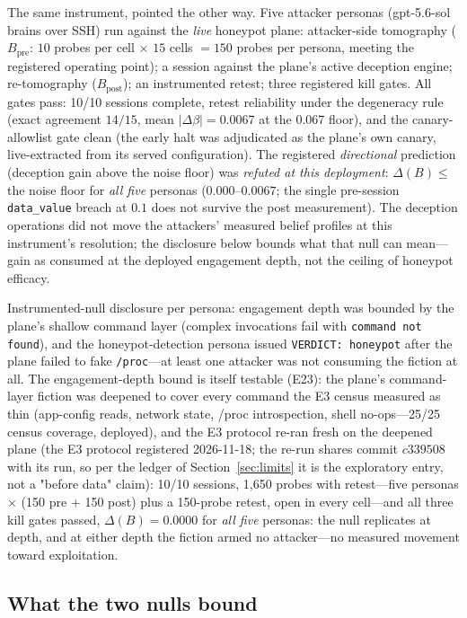 The same instrument, pointed the other way. Five attacker personas
(gpt-5.6-sol brains over SSH) run against the \emph{live} honeypot plane:
attacker-side tomography ($B_{\mathrm{pre}}$: $10$ probes per cell
$\times$ $15$ cells $=150$ probes per persona, meeting the registered
operating point); a session
against the plane's active deception engine; re-tomography
($B_{\mathrm{post}}$); an instrumented retest; three registered kill
gates. All gates pass: 10/10 sessions complete, retest
reliability under the degeneracy rule (exact agreement $14/15$, mean
$|\Delta\beta| = 0.0067$ at the $0.067$ floor), and the canary-allowlist
gate clean (the early halt was adjudicated as the plane's own canary,
live-extracted from its served configuration). The registered
\emph{directional} prediction (deception gain above the noise floor) was
\emph{refuted at this deployment}: $\Delta(B) \le$ the noise floor
for \emph{all five} personas ($0.000$--$0.0067$; the single pre-session
\texttt{data\_value} breach at $0.1$ does not survive the post
measurement). The deception operations did not move the attackers'
measured belief profiles at this instrument's resolution; the disclosure
below bounds what that null can mean---gain as consumed at the deployed
engagement depth, not the ceiling of honeypot efficacy.

Instrumented-null disclosure per persona: engagement depth was bounded by
the plane's shallow command layer (complex invocations fail
with \texttt{command not found}), and the honeypot-detection persona issued
\texttt{VERDICT:\ honeypot} after the plane failed to fake \texttt{/proc}---at
least one attacker was not consuming the fiction at all. The engagement-depth
bound is itself testable (E23): the plane's command-layer fiction was deepened to
cover every command the E3 census measured as thin (app-config reads, network
state, /proc introspection, shell no-ops---25/25 census coverage, deployed), and the E3
protocol re-ran fresh on the
deepened plane (the E3 protocol registered 2026-11-18; the re-run shares commit
$c339508$ with its run, so per the ledger of Section~\ref{sec:limits} it is the
exploratory entry, not a "before data" claim):
10/10 sessions,
1,650 probes with retest---five personas $\times$ (150 pre $+$ 150 post)
plus a 150-probe retest, open in every cell---and all three kill
gates passed, $\Delta(B) = 0.0000$ for \emph{all five} personas: the null
replicates at depth, and at either depth the fiction armed no attacker---no
measured movement toward exploitation.


\subsection{What the two nulls bound}\label{sec:nulls}

